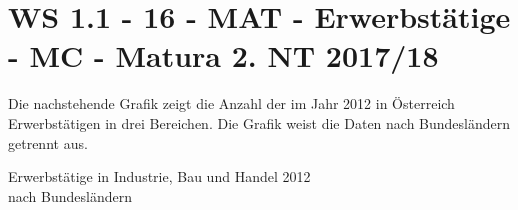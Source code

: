 \section{WS 1.1 - 16 - MAT - Erwerbstätige - MC - Matura 2. NT 2017/18}

\begin{beispiel}[WS 1.1]{1}
Die nachstehende Grafik zeigt die Anzahl der im Jahr 2012 in Österreich Erwerbstätigen in drei Bereichen. Die Grafik weist die Daten nach Bundesländern getrennt aus.\vspace{-0,2cm}

\begin{center}
\begin{small}
Erwerbstätige in Industrie, Bau und Handel 2012 \\
nach Bundesländern
\end{small}



\end{center}
\end{beispiel}
